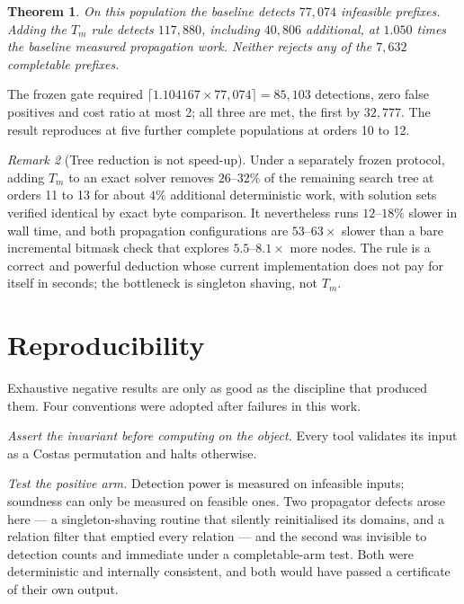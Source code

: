 \documentclass[11pt,a4paper]{article}
\newtheorem{theorem}{Theorem}[section]
\theoremstyle{definition}
\theoremstyle{remark}
\newtheorem{remark}[theorem]{Remark}
\begin{document}
\begin{theorem}\label{thm:tm}
On this population the baseline detects $77{,}074$ infeasible prefixes. Adding
the $T_m$ rule detects $117{,}880$, including $40{,}806$ additional, at $1.050$
times the baseline measured propagation work. Neither rejects any of the
$7{,}632$ completable prefixes.
\end{theorem}

The frozen gate required $\lceil 1.104167\times77{,}074\rceil = 85{,}103$
detections, zero false positives and cost ratio at most 2; all three are met, the
first by $32{,}777$. The result reproduces at five further complete populations
at orders 10 to 12.

\begin{remark}[Tree reduction is not speed-up]
Under a separately frozen protocol, adding $T_m$ to an exact solver removes
$26$--$32\%$ of the remaining search tree at orders 11 to 13 for about $4\%$
additional deterministic work, with solution sets verified identical by exact
byte comparison. It nevertheless runs $12$--$18\%$ slower in wall time, and both
propagation configurations are $53$--$63\times$ slower than a bare incremental
bitmask check that explores $5.5$--$8.1\times$ more nodes. The rule is a correct
and powerful deduction whose current implementation does not pay for itself in
seconds; the bottleneck is singleton shaving, not $T_m$.
\end{remark}

\section{Reproducibility}
\label{sec:repro}

Exhaustive negative results are only as good as the discipline that produced
them. Four conventions were adopted after failures in this work.

\emph{Assert the invariant before computing on the object.} Every tool validates
its input as a Costas permutation and halts otherwise.

\emph{Test the positive arm.} Detection power is measured on infeasible inputs;
soundness can only be measured on feasible ones. Two propagator defects arose
here --- a singleton-shaving routine that silently reinitialised its domains, and
a relation filter that emptied every relation --- and the second was invisible to
detection counts and immediate under a completable-arm test. Both were
deterministic and internally consistent, and both would have passed a certificate
of their own output.
\end{document}
